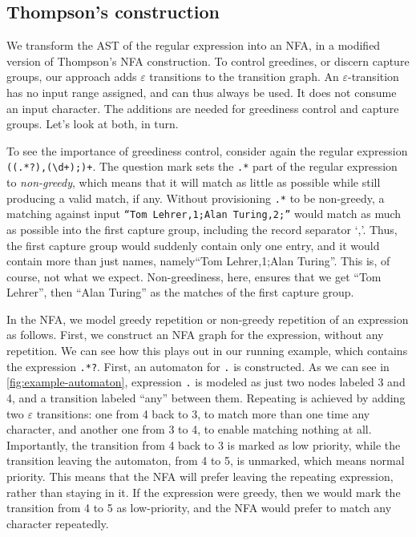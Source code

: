 \documentclass[english]{sigplanconf}
\theoremstyle{definition}
\begin{document}
\subsection{Thompson's construction} 

We transform the AST of the regular expression into an NFA,
in a modified version of Thompson's NFA construction. To
control greedines, or discern capture groups, our approach adds
$\varepsilon$ transitions to the transition graph. An
$\varepsilon$-transition has no input range assigned, and can thus always
be used. It does not consume an input character.
The additions are needed for greediness control and capture groups.
Let's look at both, in turn.

To see the importance of greediness control, consider again the regular
expression \texttt{((.*?),(\textbackslash{}d+);)+}. The question
mark sets the \texttt{.*} part of the regular expression to
\emph{non-greedy}, which means that it will match as little as
possible while still producing a valid match, if any.  Without
provisioning \texttt{.*} to be non-greedy, a matching against input
\texttt{``Tom Lehrer,1;Alan Turing,2;''} would match as much as
possible into the first capture group, including the record separator
`,'.  Thus, the first capture group would suddenly contain only one
entry, and it would contain more than just names, namely``Tom
Lehrer,1;Alan Turing''.  This is, of course, not what we expect.
Non-greediness, here, ensures that we get ``Tom Lehrer'', then
``Alan Turing'' as the matches of the first capture group.

In the NFA, we model greedy repetition or non-greedy repetition of
an expression as follows.  First, we construct an NFA graph for the
expression, without any repetition.  We can see how this plays out
in our running example, which contains the expression \texttt{.*?}.
First, an automaton for \texttt{.} is constructed.  As we can see
in \autoref{fig:example-automaton}, expression \texttt{.} is modeled as
just two nodes labeled 3 and 4, and a transition labeled ``any''
between them.  Repeating is achieved by adding two $\varepsilon$
transitions: one from 4 back to 3, to match more than one time any
character, and another one from 3 to 4, to enable matching nothing
at all.  Importantly, the transition from 4 back to 3 is marked as
low priority, while the transition leaving the automaton, from 4
to 5, is unmarked, which means normal priority.  This means that
the NFA will prefer leaving the repeating expression, rather than
staying in it.  If the expression were greedy, then we would mark
the transition from 4 to 5 as low-priority, and the NFA would prefer
to match any character repeatedly.
\end{document}
